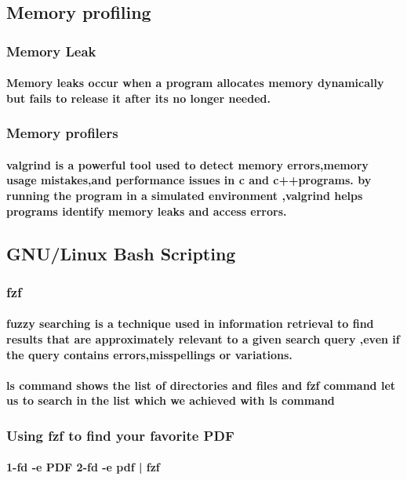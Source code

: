 \documentclass[titlepage]{article}
\begin{document}
 \subsection {Memory profiling}
 \subsubsection{Memory Leak}
 \paragraph{Memory leaks occur when a program allocates memory dynamically but fails to release it after its no longer needed.}
 \subsubsection{Memory profilers }
 \paragraph{valgrind is a powerful tool used to detect memory errors,memory usage mistakes,and performance issues in c and c++programs.
 by running the program in a simulated environment ,valgrind helps programs identify memory leaks and access errors.}
 \subsection{GNU/Linux Bash Scripting}
 \subsubsection{fzf}
 \paragraph{fuzzy searching is a technique used in information retrieval to find results that are
  approximately relevant to a given search query ,even if the query contains errors,misspellings or variations.}
  \paragraph{ls command shows the list of directories and files and fzf
   command let us to search in the list which we achieved with ls command}
\subsubsection{Using fzf to find your favorite PDF}
\paragraph{1-fd -e PDF 2-fd -e pdf | fzf}
\end{document}
